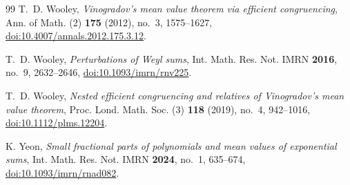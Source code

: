 \documentclass[11pt,reqno]{amsart}
\numberwithin{equation}{section}
\theoremstyle{definition}
\theoremstyle{remark}
\begin{document}
\begin{thebibliography}{99}
T.~D. Wooley,
\emph{Vinogradov's mean value theorem via efficient congruencing},
Ann. of Math. (2) \textbf{175} (2012), no.~3, 1575--1627,
\href{https://doi.org/10.4007/annals.2012.175.3.12}{doi:10.4007/annals.2012.175.3.12}.

T.~D. Wooley,
\emph{Perturbations of Weyl sums},
Int. Math. Res. Not. IMRN \textbf{2016}, no.~9, 2632--2646,
\href{https://doi.org/10.1093/imrn/rnv225}{doi:10.1093/imrn/rnv225}.

T.~D. Wooley,
\emph{Nested efficient congruencing and relatives of Vinogradov's mean value theorem},
Proc. Lond. Math. Soc. (3) \textbf{118} (2019), no.~4, 942--1016,
\href{https://doi.org/10.1112/plms.12204}{doi:10.1112/plms.12204}.

K. Yeon,
\emph{Small fractional parts of polynomials and mean values of exponential sums},
Int. Math. Res. Not. IMRN \textbf{2024}, no.~1, 635--674,
\href{https://doi.org/10.1093/imrn/rnad082}{doi:10.1093/imrn/rnad082}.

\end{thebibliography}
\end{document}
